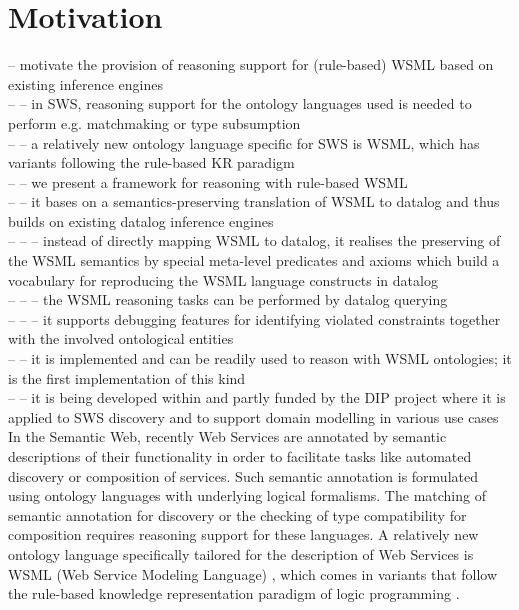 \section{Motivation\label{sec:motivation}}
-- motivate the provision of reasoning support for (rule-based) WSML based on existing inference engines \\
-- -- in SWS, reasoning support for the ontology languages used is needed to perform e.g. matchmaking or type subsumption \\
-- -- a relatively new ontology language specific for SWS is WSML, which has variants following the  rule-based KR paradigm \\
-- -- we present a framework for reasoning with rule-based WSML \\
-- -- it bases on a semantics-preserving translation of WSML to datalog and thus builds on existing datalog inference engines \\
-- -- -- instead of directly mapping WSML to datalog, it realises the preserving of the WSML semantics by special meta-level predicates and axioms which build a vocabulary for reproducing the WSML language constructs in datalog \\
-- -- -- the WSML reasoning tasks can be performed by datalog querying \\
-- -- -- it supports debugging features for identifying violated constraints together with the involved ontological entities \\
-- -- it is implemented and can be readily used to reason with WSML ontologies; it is the first implementation of this kind \\
-- -- it is being developed within and partly funded by the DIP project where it is applied to SWS discovery and to support domain modelling in various use cases \\

In the Semantic Web, recently Web Services are annotated by
semantic descriptions of their functionality in order to
facilitate tasks like automated discovery or composition of
services. Such semantic annotation is formulated using ontology
languages with underlying logical formalisms. The matching of
semantic annotation for discovery or the checking of type
compatibility for composition requires reasoning support for these
languages. A relatively new ontology language specifically
tailored for the description of Web Services is WSML (Web Service
Modeling Language) \cite{wsml}, which comes in variants that
follow the rule-based knowledge representation paradigm of logic
programming \cite{}.

